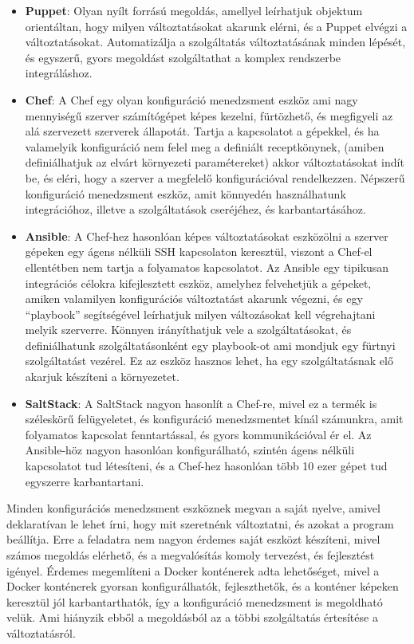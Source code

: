 \documentclass[11pt,magyar,a4paper,twoside,]{report}
\begin{document}
\begin{itemize}
\item
  \textbf{Puppet}\citep{puppet}: Olyan nyílt forrású megoldás, amellyel
  leírhatjuk objektum orientáltan, hogy milyen változtatásokat akarunk
  elérni, és a Puppet elvégzi a változtatásokat. Automatizálja a
  szolgáltatás változtatásának minden lépését, és egyszerű, gyors
  megoldást szolgáltathat a komplex rendszerbe integráláshoz.
\item
  \textbf{Chef}\citep{chef}: A Chef egy olyan konfiguráció menedzsment
  eszköz ami nagy mennyiségű szerver számítógépet képes kezelni,
  fürtözhető, és megfigyeli az alá szervezett szerverek állapotát.
  Tartja a kapcsolatot a gépekkel, és ha valamelyik konfiguráció nem
  felel meg a definiált receptkönynek, (amiben definiálhatjuk az elvárt
  környezeti paramétereket) akkor változtatásokat indít be, és eléri,
  hogy a szerver a megfelelő konfigurációval rendelkezzen. Népszerű
  konfiguráció menedzsment eszköz, amit könnyedén használhatunk
  integrációhoz, illetve a szolgáltatások cseréjéhez, és
  karbantartásához.
\item
  \textbf{Ansible}\citep{ansible}: A Chef-hez hasonlóan képes
  változtatásokat eszközölni a szerver gépeken egy ágens nélküli SSH
  kapcsolaton keresztül, viszont a Chef-el ellentétben nem tartja a
  folyamatos kapcsolatot. Az Ansible egy tipikusan integrációs célokra
  kifejlesztett eszköz, amelyhez felvehetjük a gépeket, amiken
  valamilyen konfigurációs változtatást akarunk végezni, és egy
  ``playbook'' segítségével leírhatjuk milyen változásokat kell
  végrehajtani melyik szerverre. Könnyen irányíthatjuk vele a
  szolgáltatásokat, és definiálhatunk szolgáltatásonként egy playbook-ot
  ami mondjuk egy fürtnyi szolgáltatást vezérel. Ez az eszköz hasznos
  lehet, ha egy szolgáltatásnak elő akarjuk készíteni a környezetet.
\item
  \textbf{SaltStack}\citep{saltstack}: A SaltStack nagyon hasonlít a
  Chef-re, mivel ez a termék is széleskörű felügyeletet, és konfiguráció
  menedzsmentet kínál számunkra, amit folyamatos kapcsolat
  fenntartással, és gyors kommunikációval ér el. Az Ansible-höz nagyon
  hasonlóan konfigurálható, szintén ágens nélküli kapcsolatot tud
  létesíteni, és a Chef-hez hasonlóan több 10 ezer gépet tud egyszerre
  karbantartani.
\end{itemize}

Minden konfigurációs menedzsment eszköznek megvan a saját nyelve, amivel
deklaratívan le lehet írni, hogy mit szeretnénk változtatni, és azokat a
program beállítja. Erre a feladatra nem nagyon érdemes saját eszközt
készíteni, mivel számos megoldás elérhető, és a megvalósítás komoly
tervezést, és fejlesztést igényel. Érdemes megemlíteni a Docker
konténerek adta lehetőséget, mivel a Docker konténerek gyorsan
konfigurálhatók, fejleszthetők, és a konténer képeken keresztül jól
karbantarthatók, így a konfiguráció menedzsment is megoldható velük. Ami
hiányzik ebből a megoldásból az a többi szolgáltatás értesítése a
változtatásról.
\end{document}

